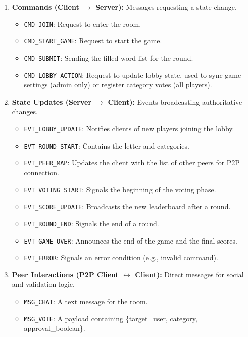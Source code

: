 \documentclass{scrartcl}
\begin{document}
\begin{enumerate}
    \item \textbf{Commands (Client $\rightarrow$ Server):} 
    Messages requesting a state change.
    \begin{itemize}
        \item \texttt{CMD\_JOIN}: Request to enter the room.
        \item \texttt{CMD\_START\_GAME}: Request to start the game.
        \item \texttt{CMD\_SUBMIT}: Sending the filled word list for the round.
        \item \texttt{CMD\_LOBBY\_ACTION}: Request to update lobby state, used to sync game settings (admin only) or register category votes (all players).
    \end{itemize}

    \item \textbf{State Updates (Server $\rightarrow$ Client):} 
    Events broadcasting authoritative changes.
    \begin{itemize}
      \item \texttt{EVT\_LOBBY\_UPDATE}: Notifies clients of new players joining the lobby.
      \item \texttt{EVT\_ROUND\_START}: Contains the letter and categories.
      \item \texttt{EVT\_PEER\_MAP}: Updates the client with the list of other peers for P2P connection.
      \item \texttt{EVT\_VOTING\_START}: Signals the beginning of the voting phase.
      \item \texttt{EVT\_SCORE\_UPDATE}: Broadcasts the new leaderboard after a round.
      \item \texttt{EVT\_ROUND\_END}: Signals the end of a round.
      \item \texttt{EVT\_GAME\_OVER}: Announces the end of the game and the final scores.
      \item \texttt{EVT\_ERROR}: Signals an error condition (e.g., invalid command).
    \end{itemize}

    \item \textbf{Peer Interactions (P2P Client $\leftrightarrow$ Client):} 
    Direct messages for social and validation logic.
    \begin{itemize}
        \item \texttt{MSG\_CHAT}: A text message for the room.
        \item \texttt{MSG\_VOTE}: A payload containing \{target\_user, category, approval\_boolean\}.
    \end{itemize}
\end{enumerate}
\end{document}
